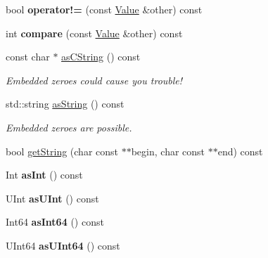 \begin{DoxyCompactItemize}
bool {\bfseries operator!=} (const \hyperlink{class_json_1_1_value}{Value} \&other) const
\item 
\mbox{\label{class_json_1_1_value_aefa4464ca1bb0bcc9a87b38ed62ca2e0}} 
int {\bfseries compare} (const \hyperlink{class_json_1_1_value}{Value} \&other) const
\item 
\mbox{\label{class_json_1_1_value_a16668c8db7ef0a5de040012f0dfd84b0}} 
const char $\ast$ \hyperlink{class_json_1_1_value_a16668c8db7ef0a5de040012f0dfd84b0}{as\+C\+String} () const
\begin{DoxyCompactList}\small\item\em Embedded zeroes could cause you trouble! \end{DoxyCompactList}\item 
\mbox{\label{class_json_1_1_value_ab0d86bf425efefd03513e8dbfaca317b}} 
std\+::string \hyperlink{class_json_1_1_value_ab0d86bf425efefd03513e8dbfaca317b}{as\+String} () const
\begin{DoxyCompactList}\small\item\em Embedded zeroes are possible. \end{DoxyCompactList}\item 
bool \hyperlink{class_json_1_1_value_a2e1b7be6bde2fe23f15290d9ddbbdf8a}{get\+String} (char const $\ast$$\ast$begin, char const $\ast$$\ast$end) const
\item 
\mbox{\label{class_json_1_1_value_a614d635bc248a592593feb322cd15ab8}} 
Int {\bfseries as\+Int} () const
\item 
\mbox{\label{class_json_1_1_value_a74b305583ec3aacf4f9dd06e799dc265}} 
U\+Int {\bfseries as\+U\+Int} () const
\item 
\mbox{\label{class_json_1_1_value_aa647ac4fe51a2e325c063ebe32262b44}} 
Int64 {\bfseries as\+Int64} () const
\item 
\mbox{\label{class_json_1_1_value_a0e44a5a4cd0c099f9570dfa25813eb60}} 
U\+Int64 {\bfseries as\+U\+Int64} () const
\item 
\mbox{\label{class_json_1_1_value_ab16f2ea2a117a1b3b576acab8b6a700d}} 

\end{DoxyCompactItemize}
